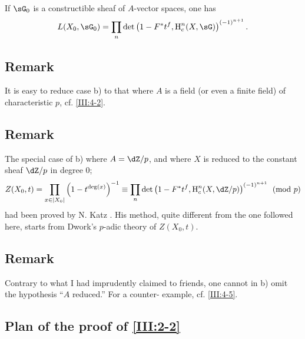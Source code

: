 \subsubsection{}\label{III:2-4-1}

If $\sG_0$ is a constructible sheaf of $A$-vector spaces, one has
\[
  L(X_0,\sG_0) = \prod_n \det\left(1-F^* t^f,\h_c^n(X,\sG)\right)^{(-1)^{n+1}} \text{.}
\]




\subsection{Remark}\label{III:2-5}

It is easy to reduce case b) to that where $A$ is a field (or even
a finite field) of characteristic $p$, cf. \ref{III:4-2}.




\subsection{Remark}\label{III:2-6}

The special case of b) where $A=\dZ/p$, and where $X$ is reduced to the constant
sheaf $\dZ/p$ in degree $0$;
\[
  Z(X_0,t) = \prod_{x\in |X_0|} \left(1-t^{\deg(x)}\right)^{-1}
      \equiv \prod_n \det\left(1-F^* t^f,\h_c^n(X,\dZ/p)\right)^{(-1)^{n+1}} \pmod p
\]
had been proved by N. Katz \cite[XXII 3.1]{sga7}. His method, quite
different from the one followed here, starts from Dwork's $p$-adic theory of
$Z(X_0,t)$.




\subsection{Remark}\label{III:2-7}


Contrary to what I had imprudently claimed to friends, one cannot
in b) omit the hypothesis ``$A$ reduced.'' For a counter-
example, cf. \ref{III:4-5}.




\subsection{Plan of the proof of \ref{III:2-2}}\label{III:2-8}

